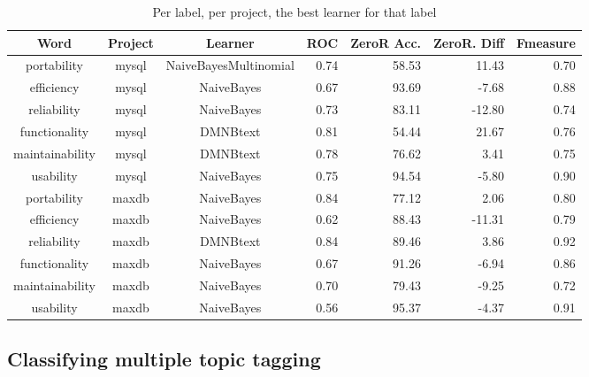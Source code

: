 \documentclass{acm_proc_article-sp}
\begin{document}
\begin{table*}
\begin{tabular}{ccc|rrrr}
Word & Project & Learner & ROC & ZeroR Acc. & ZeroR. Diff & Fmeasure\\
\hline
portability &  mysql &  NaiveBayesMultinomial &  0.74 &  58.53 &  11.43 &  0.70  \\ 
efficiency &  mysql &  NaiveBayes &  0.67 &  93.69 &  -7.68 &  0.88 \\ 
reliability &  mysql &  NaiveBayes &  0.73 &  83.11 &  -12.80 &  0.74 \\ 
functionality &  mysql &  DMNBtext &  0.81 &  54.44 &  21.67 &  0.76 \\ 
maintainability &  mysql &  DMNBtext &  0.78 &  76.62 &  3.41 &  0.75 \\ 
usability &  mysql &  NaiveBayes &  0.75 &  94.54 &  -5.80 &  0.90  \\ 
 \hline 
portability &  maxdb &  NaiveBayes &  0.84 &  77.12 &  2.06 &  0.80 \\ 
efficiency &  maxdb &  NaiveBayes &  0.62 &  88.43 &  -11.31 &  0.79 \\ 
reliability &  maxdb &  DMNBtext &  0.84 &  89.46 &  3.86 &  0.92  \\ 
functionality &  maxdb &  NaiveBayes &  0.67 &  91.26 &  -6.94 &  0.86  \\ 
maintainability &  maxdb &  NaiveBayes &  0.70 &  79.43 &  -9.25 &  0.72  \\ 
usability &  maxdb &  NaiveBayes &  0.56 &  95.37 &  -4.37 &  0.91  \\ 
 \hline 
\end{tabular}
\caption{Per label, per project, the best learner for that label}
\label{fig:best-learner-per-tag}
\end{table*}

\subsection{Classifying multiple topic tagging}
\end{document}
